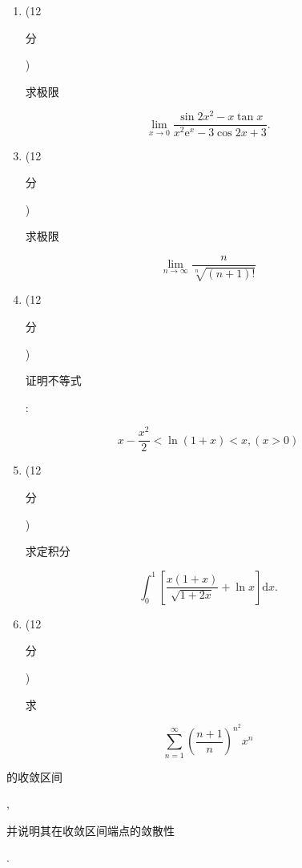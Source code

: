 \documentclass[10pt]{article}
\begin{document}
\begin{enumerate}
  \item (12 \begin{CJK}{UTF8}{mj}分\end{CJK}) \begin{CJK}{UTF8}{mj}求极限\end{CJK}
\end{enumerate}
$$
\lim _{x \rightarrow 0} \frac{\sin 2 x^{2}-x \tan x}{x^{2} \mathrm{e}^{x}-3 \cos 2 x+3} .
$$

\begin{enumerate}
  \setcounter{enumi}{2}
  \item (12 \begin{CJK}{UTF8}{mj}分\end{CJK}) \begin{CJK}{UTF8}{mj}求极限\end{CJK}
\end{enumerate}
$$
\lim _{n \rightarrow \infty} \frac{n}{\sqrt[n]{(n+1) !}}
$$

\begin{enumerate}
  \setcounter{enumi}{3}
  \item (12 \begin{CJK}{UTF8}{mj}分\end{CJK}) \begin{CJK}{UTF8}{mj}证明不等式\end{CJK}:
\end{enumerate}
$$
x-\frac{x^{2}}{2}<\ln (1+x)<x,(x>0)
$$

\begin{enumerate}
  \setcounter{enumi}{4}
  \item (12 \begin{CJK}{UTF8}{mj}分\end{CJK}) \begin{CJK}{UTF8}{mj}求定积分\end{CJK}
\end{enumerate}
$$
\int_{0}^{1}\left[\frac{x(1+x)}{\sqrt{1+2 x}}+\ln x\right] \mathrm{d} x .
$$

\begin{enumerate}
  \setcounter{enumi}{5}
  \item (12 \begin{CJK}{UTF8}{mj}分\end{CJK}) \begin{CJK}{UTF8}{mj}求\end{CJK}
\end{enumerate}
$$
\sum_{n=1}^{\infty}\left(\frac{n+1}{n}\right)^{n^{2}} x^{n}
$$
\begin{CJK}{UTF8}{mj}的收敛区间\end{CJK}, \begin{CJK}{UTF8}{mj}并说明其在收敛区间端点的敛散性\end{CJK}.
\end{document}

